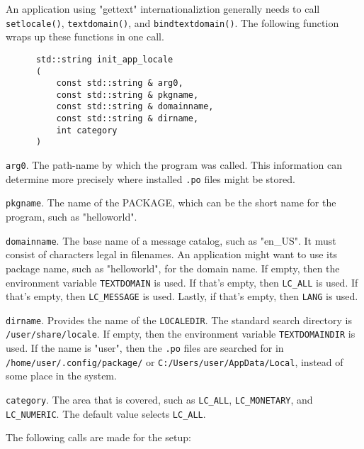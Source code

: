    An application using "gettext" internationaliztion generally needs
   to call \texttt{setlocale()},
   \texttt{textdomain()}, and \texttt{bindtextdomain()}.
   The following function wraps up these functions in one call.

   \begin{verbatim}
      std::string init_app_locale
      (
          const std::string & arg0,
          const std::string & pkgname,
          const std::string & domainname,
          const std::string & dirname,
          int category
      )
   \end{verbatim}

   \texttt{arg0}.
   The path-name by which the program was called. This information
   can determine more precisely where installed \texttt{.po} files might be
   stored.

   \texttt{pkgname}.
   The name of the PACKAGE, which can be the short name for
   the program, such as "helloworld".

   \texttt{domainname}.
   The base name of a message catalog, such as "en\_US".
   It must consist of characters legal in filenames.
   An application might want to use its
   package name, such as "helloworld", for the domain name.
   If empty, then the environment variable \texttt{TEXTDOMAIN} is used.
   If that's empty, then \texttt{LC\_ALL} is used.
   If that's empty, then \texttt{LC\_MESSAGE} is used.
   Lastly, if that's empty, then \texttt{LANG} is used.

   \texttt{dirname}.
   Provides the name of the \texttt{LOCALEDIR}.
   The standard search directory is \texttt{/user/share/locale}.
   If empty, then the environment variable
   \texttt{TEXTDOMAINDIR} is used.
   If the name is "user", then the \texttt{.po} files are searched
   for in \texttt{/home/user/.config/package/} or
   \texttt{C:/Users/user/AppData/Local}, instead of some
   place in the system.

   \texttt{category}.
   The area that is covered, such as
   \texttt{LC\_ALL}, \texttt{LC\_MONETARY}, and \texttt{LC\_NUMERIC}.
   The default value selects \texttt{LC\_ALL}.

   The following calls are made for the setup:

